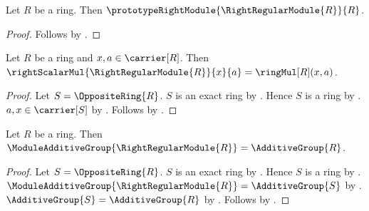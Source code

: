 \begin{proposition}\label{spike_right_regular_module_is_right_module}
    Let $R$ be a ring.
    Then $\prototypeRightModule{\RightRegularModule{R}}{R}$.
\end{proposition}
\begin{proof}
    Follows by
        .
\end{proof}

\begin{proposition}\label{spike_right_regular_scalar_apply}
    Let $R$ be a ring and $x,a\in\carrier[R]$.
    Then
        $\rightScalarMul{\RightRegularModule{R}}{x}{a}
            =\ringMul[R](x,a)$.
\end{proposition}
\begin{proof}
    Let $S=\OppositeRing{R}$.
    $S$ is an exact ring by .
    Hence $S$ is a ring by \auto.
    $a,x\in\carrier[S]$ by
        .
    Follows by
        .
\end{proof}

\begin{theorem}\label{spike_right_regular_module_additive_reduct}
    Let $R$ be a ring.
    Then
        $\ModuleAdditiveGroup{\RightRegularModule{R}}
            =\AdditiveGroup{R}$.
\end{theorem}
\begin{proof}
    Let $S=\OppositeRing{R}$.
    $S$ is an exact ring by .
    Hence $S$ is a ring by \auto.
    $\ModuleAdditiveGroup{\RightRegularModule{R}}
        =\AdditiveGroup{S}$ by
        .
    $\AdditiveGroup{S}=\AdditiveGroup{R}$ by
        .
    Follows by \auto.
\end{proof}
